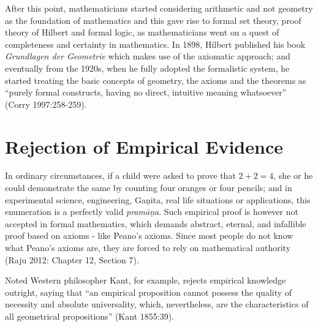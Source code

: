 After this point, mathematicians started considering arithmetic and not geometry as the foundation of mathematics and this gave rise to formal set theory, proof theory of Hilbert and formal logic, as mathematicians went on a quest of completeness and certainty in mathematics. In 1898, Hilbert published his book {\sl Grundlagen der Geometrie} which makes use of the axiomatic approach; and eventually from the 1920s, when he fully adopted the formalistic system, he started treating the basic concepts of geometry, the axioms and the theorems as “purely formal constructs, having no direct, intuitive meaning whatsoever” (Corry 1997:258-259).

\section*{Rejection of Empirical Evidence}

In ordinary circumstances, if a child were asked to prove that $2 + 2 = 4$, she or he could demonstrate the same by counting four oranges or four pencils; and in experimental science, engineering, Gaṇita, real life situations or applications, this enumeration is a perfectly valid {\sl pramāṇa}. Such empirical proof is however not accepted in formal mathematics, which demands abstract, eternal, and infallible proof based on axioms - like Peano’s axioms. Since most people do not know what Peano’s axioms are, they are forced to rely on mathematical authority (Raju 2012: Chapter 12, Section 7).

Noted Western philosopher Kant, for example, rejects empirical knowledge outright, saying that ``an empirical proposition cannot possess the quality of necessity and absolute universality, which, nevertheless, are the characteristics of all geometrical propositions'' (Kant 1855:39). 

